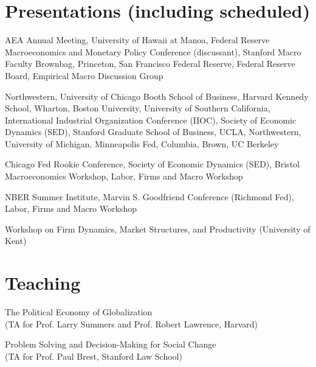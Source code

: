 \documentclass[letterpaper]{article}
\begin{document}
\section*{Presentations (including scheduled)}
\begin{description}[labelindent=0pt, labelwidth=1in, labelsep*=1em, leftmargin =!, font=\normalfont]
\item[2025] AEA Annual Meeting, University of Hawaii at Manoa, Federal Reserve Macroeconomics and Monetary Policy Conference (discussant), Stanford Macro Faculty Brownbag, Princeton, San Francisco Federal Reserve, Federal Reserve Board, Empirical Macro Discussion Group
\item[2024] Northwestern, University of Chicago Booth School of Business, Harvard Kennedy School, Wharton, Boston University, University of Southern California, International Industrial Organization Conference (IIOC), Society of Economic Dynamics (SED), Stanford Graduate School of Business, UCLA, Northwestern, University of Michigan, Minneapolis Fed, Columbia, Brown, UC Berkeley %
\item[2023] Chicago Fed Rookie Conference, Society of Economic Dynamics (SED), Bristol Macroeconomics Workshop, Labor, Firms and Macro Workshop
\item[2022] NBER Summer Institute, Marvin S. Goodfriend Conference (Richmond Fed), Labor, Firms and Macro Workshop
\item[2021] Workshop on Firm Dynamics, Market Structures, and Productivity (University of Kent) 
\end{description}

\section*{Teaching}
\begin{description}[labelindent=0pt, labelwidth=1in, labelsep*=1em, leftmargin =!, font=\normalfont]
\item[2021] The Political Economy of Globalization\\ (TA for Prof. Larry Summers and Prof. Robert Lawrence, Harvard) 
\item[2015] Problem Solving and Decision-Making for Social Change\\ (TA for Prof. Paul Brest, Stanford Law School)
\end{description}
\end{document}
